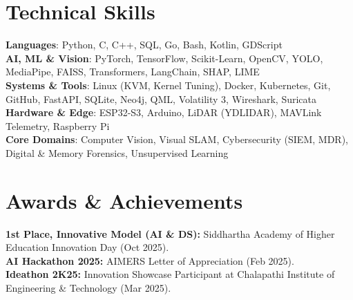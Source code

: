 \documentclass[letterpaper,11pt]{article}
\begin{document}
\section{Technical Skills}
 \begin{itemize}[leftmargin=8pt, label={}, topsep=3pt, partopsep=0pt, itemsep=1pt, parsep=0pt]
    \small{\item{
     \textbf{Languages}{: Python, C, C++, SQL, Go, Bash, Kotlin, GDScript} \\
     \textbf{AI, ML \& Vision}{: PyTorch, TensorFlow, Scikit-Learn, OpenCV, YOLO, MediaPipe, FAISS, Transformers, LangChain, SHAP, LIME} \\
     \textbf{Systems \& Tools}{: Linux (KVM, Kernel Tuning), Docker, Kubernetes, Git, GitHub, FastAPI, SQLite, Neo4j, QML, Volatility 3, Wireshark, Suricata} \\
     \textbf{Hardware \& Edge}{: ESP32-S3, Arduino, LiDAR (YDLIDAR), MAVLink Telemetry, Raspberry Pi} \\
     \textbf{Core Domains}{: Computer Vision, Visual SLAM, Cybersecurity (SIEM, MDR), Digital \& Memory Forensics, Unsupervised Learning}
    }}
 \end{itemize}
 \vspace{-4pt}

\section{Awards \& Achievements}
 \begin{itemize}[leftmargin=8pt, label={}, topsep=3pt, partopsep=0pt, itemsep=1pt, parsep=0pt]
    \small{\item{
     \textbf{1st Place, Innovative Model (AI \& DS):} Siddhartha Academy of Higher Education Innovation Day (Oct 2025). \\
     \textbf{AI Hackathon 2025:} AIMERS Letter of Appreciation (Feb 2025). \\
     \textbf{Ideathon 2K25:} Innovation Showcase Participant at Chalapathi Institute of Engineering \& Technology (Mar 2025).
    }}
 \end{itemize}
 \vspace{-4pt}
\end{document}
